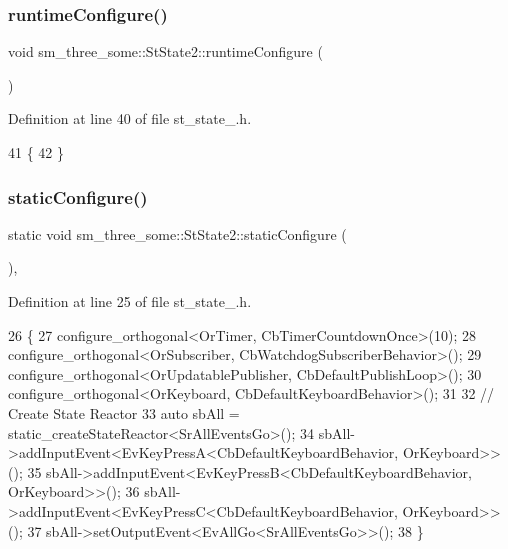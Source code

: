 \subsubsection{\texorpdfstring{runtime\+Configure()}{runtimeConfigure()}}
{\footnotesize\ttfamily void sm\+\_\+three\+\_\+some\+::\+St\+State2\+::runtime\+Configure (\begin{DoxyParamCaption}{ }\end{DoxyParamCaption})\hspace{0.3cm}{\ttfamily [inline]}}



Definition at line 40 of file st\+\_\+state\+\_.\+h.


\begin{DoxyCode}
41     \{
42     \}
\end{DoxyCode}
\mbox{\label{structsm__three__some_1_1StState2_af07ae40962e343ce9605288f0ebad82b}} 
\subsubsection{\texorpdfstring{static\+Configure()}{staticConfigure()}}
{\footnotesize\ttfamily static void sm\+\_\+three\+\_\+some\+::\+St\+State2\+::static\+Configure (\begin{DoxyParamCaption}{ }\end{DoxyParamCaption})\hspace{0.3cm}{\ttfamily [inline]}, {\ttfamily [static]}}



Definition at line 25 of file st\+\_\+state\+\_.\+h.


\begin{DoxyCode}
26     \{
27         configure\_orthogonal<OrTimer, CbTimerCountdownOnce>(10);
28         configure\_orthogonal<OrSubscriber, CbWatchdogSubscriberBehavior>();
29         configure\_orthogonal<OrUpdatablePublisher, CbDefaultPublishLoop>();
30         configure\_orthogonal<OrKeyboard, CbDefaultKeyboardBehavior>();
31 
32         \textcolor{comment}{// Create State Reactor}
33         \textcolor{keyword}{auto} sbAll = static\_createStateReactor<SrAllEventsGo>();
34         sbAll->addInputEvent<EvKeyPressA<CbDefaultKeyboardBehavior, OrKeyboard>>();
35         sbAll->addInputEvent<EvKeyPressB<CbDefaultKeyboardBehavior, OrKeyboard>>();
36         sbAll->addInputEvent<EvKeyPressC<CbDefaultKeyboardBehavior, OrKeyboard>>();
37         sbAll->setOutputEvent<EvAllGo<SrAllEventsGo>>();
38     \}
\end{DoxyCode}


